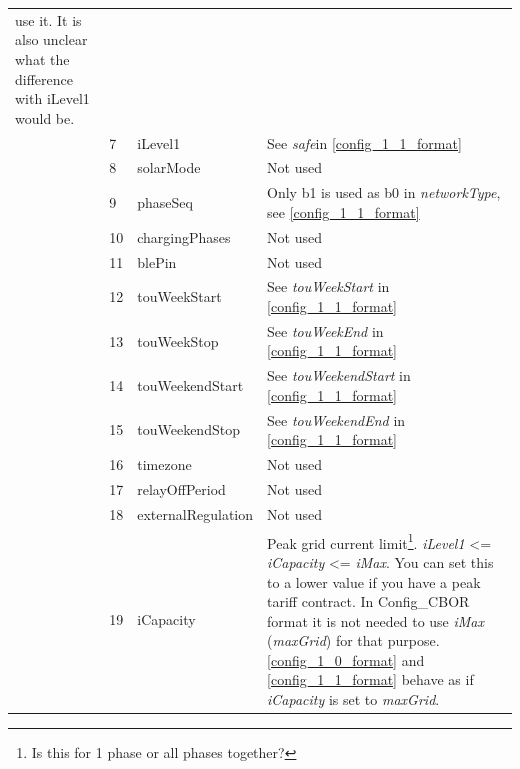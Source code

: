 \documentclass[a4paper]{article}
\newcommand{\secref}[1]{\ref{#1} \nameref{#1}}
\begin{document}
\begin{longtable}[]{@{}lllp{12cm}@{}}
{	use it. 
	It is also unclear what the difference with iLevel1 would be.} \\
	  & 7  & iLevel1            & See \emph{safe}in                                                                   
	\secref{config_1_1_format} \\
	  & 8  & solarMode          & Not used                                                                            \\
	  & 9  & phaseSeq           & Only b1 is used as b0 in \emph{networkType}, see                                    
	\secref{config_1_1_format} \\
	  & 10 & chargingPhases     & Not used                                                                            \\
	  & 11 & blePin             & Not used                                                                            \\
	  & 12 & touWeekStart       & See \emph{touWeekStart} in                                                          
	\secref{config_1_1_format} \\
	  & 13 & touWeekStop        & See \emph{touWeekEnd} in                                                            
	\secref{config_1_1_format} \\
	  & 14 & touWeekendStart    & See \emph{touWeekendStart} in                                                       
	\secref{config_1_1_format} \\
	  & 15 & touWeekendStop     & See \emph{touWeekendEnd} in                                                         
	\secref{config_1_1_format}\\
	  & 16 & timezone           & Not used                                                                            \\
	  & 17 & relayOffPeriod     & Not used                                                                            \\
	  & 18 & externalRegulation & Not used                                                                            \\
	  & 19 & iCapacity          & Peak grid current limit\footnote{Is this for 1 phase or all phases together?}.      
	\emph{iLevel1} \textless= \emph{iCapacity} \textless= \emph{iMax}. You
	can set this to a lower value if you have a peak tariff contract. In
	Config\_CBOR format it is not needed to use \emph{iMax} (\emph{maxGrid})
	for that purpose.
	\secref{config_1_0_format} and
	\secref{config_1_1_format} behave as if \emph{iCapacity} is set to \emph{maxGrid}. \\
\end{longtable}
\end{document}

